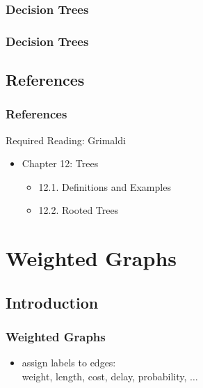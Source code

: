\documentclass[dvipsnames]{beamer}
\begin{document}
\begin{frame}
  \frametitle{Decision Trees}

  \begin{example}[in 3 weighings]
    \begin{center}
    \end{center}
  \end{example}
\end{frame}

\begin{frame}
  \frametitle{Decision Trees}

  \begin{example}[in 2 weighings]
    \begin{center}
    \end{center}
  \end{example}
\end{frame}


\subsection*{References}

\begin{frame}
  \frametitle{References}

  \begin{block}{Required Reading: Grimaldi}
    \begin{itemize}
      \item Chapter 12: Trees
      \begin{itemize}
        \item 12.1. \alert{Definitions and Examples}
        \item 12.2. \alert{Rooted Trees}
      \end{itemize}
    \end{itemize}
  \end{block}
\end{frame}

\section{Weighted Graphs}

\subsection{Introduction}

\begin{frame}
  \frametitle{Weighted Graphs}

  \begin{itemize}
    \item assign labels to edges:\\
      weight, length, cost, delay, probability, $\ldots$
  \end{itemize}
\end{frame}
\end{document}
